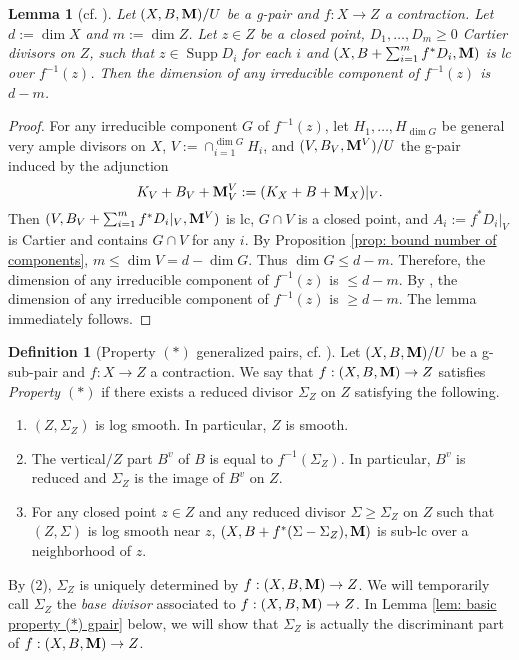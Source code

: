 \documentclass[11pt]{amsart}
\numberwithin{equation}{section}
\newcommand{\Mm}{{\bf{M}}}
\newcommand{\Supp}{\operatorname{Supp}}
\newtheorem{lem}[thm]{Lemma}
\theoremstyle{definition}
\newtheorem{defn}[thm]{Definition}
\theoremstyle{definition}
\theoremstyle{definition}
\begin{document}
\begin{lem}[cf. {\cite[Lemma 2.12]{ACSS21}}]\label{lem: dimension of full lc rank}
Let $(X,B,\Mm)/U$ be a g-pair and $f: X\rightarrow Z$ a contraction. Let $d:=\dim X$ and $m:=\dim Z$. Let $z\in Z$ be a closed point, $D_1,\dots,D_m\geq 0$ Cartier divisors on $Z$, such that $z\in\Supp D_i$ for each $i$ and $(X,B+\sum_{i=1}^mf^*D_i,\Mm)$ is lc over $f^{-1}(z)$. Then the dimension of any irreducible component of $f^{-1}(z)$ is $d-m$.
\end{lem}

\begin{proof}
For any irreducible component $G$ of $f^{-1}(z)$, let $H_1,\dots,H_{\dim G}$ be general very ample divisors on $X$, $V:=\cap_{i=1}^{\dim G}H_i$, and $(V,B_V,\Mm^V)/U$ the g-pair induced by the adjunction $$K_V+B_V+\Mm^V_V:=(K_X+B+\Mm_X)|_V.$$ Then $(V,B_V+\sum_{i=1}^mf^*D_i|_V,\Mm^V)$ is lc, $G\cap V$ is a closed point, and $A_i:=f^*D_i|_V$ is Cartier and contains $G\cap V$ for any $i$. By Proposition \ref{prop: bound number of components}, $m\leq\dim V=d-\dim G$. Thus $\dim G\leq d-m$. Therefore, the dimension of  any irreducible component of $f^{-1}(z)$ is $\leq d-m$. By \cite[Exercise II 3.22 (a)]{Har77}, the dimension of  any irreducible component of $f^{-1}(z)$ is $\geq d-m$. The lemma immediately follows.
\end{proof}

\begin{defn}[Property $(*)$ generalized pairs, cf. {\cite[Definition 2.13]{ACSS21}}]\label{defn: property *}
Let $(X,B,\Mm)/U$ be a g-sub-pair and $f: X\rightarrow Z$ a contraction. We say that $f: (X,B,\Mm)\rightarrow Z$ satisfies \emph{Property $(*)$} if there exists a reduced divisor $\Sigma_Z$ on $Z$ satisfying the following.
\begin{enumerate}
\item $(Z,\Sigma_Z)$ is log smooth. In particular, $Z$ is smooth.
\item The vertical$/Z$ part $B^v$ of $B$ is equal to $f^{-1}(\Sigma_Z)$. In particular, $B^v$ is reduced and $\Sigma_Z$ is the image of $B^v$ on $Z$.
\item For any closed point $z\in Z$ and any reduced divisor  $\Sigma\ge \Sigma_Z$ on $Z$ such that  $(Z,\Sigma)$ is log smooth near $z$, $(X,B+f^*(\Sigma-\Sigma_Z),\Mm)$ is sub-lc over a neighborhood of $z$.
\end{enumerate}
By (2), $\Sigma_Z$ is uniquely determined by $f: (X,B,\Mm)\rightarrow Z$. We will temporarily call $\Sigma_Z$ the \emph{base divisor} associated to $f: (X,B,\Mm)\rightarrow Z$. In Lemma \ref{lem: basic property (*) gpair} below, we will show that $\Sigma_Z$ is actually the discriminant part of $f: (X,B,\Mm)\rightarrow Z$.
\end{defn}
\end{document}
